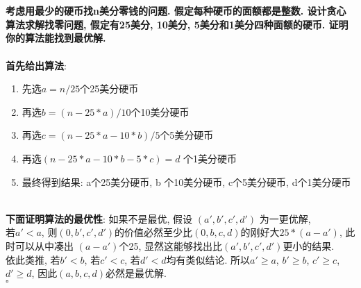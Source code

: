 \documentclass[UTF8]{article}
\newcommand{\jumpLine} {\hspace*{\fill} \\}
\begin{document}
\section{}
\textbf{考虑用最少的硬币找n美分零钱的问题. 假定每种硬币的面额都是整数. 设计贪心算法求解找零问题, 假定有25美分, 10美分, 5美分和1美分四种面额的硬币. 证明你的算法能找到最优解.}\\
\jumpLine
\textbf{首先给出算法}:
\begin{enumerate}[1. ]
	\item 先选$a=n/25$个25美分硬币
	\item 再选$b=(n-25*a)/10$个10美分硬币
	\item 再选$c=(n-25*a-10*b)/5$个5美分硬币
	\item 再选$(n-25*a-10*b-5*c)=d$ 个1美分硬币
	\item 最终得到结果: a个25美分硬币, b 个10美分硬币, c个5美分硬币, d个1美分硬币
\end{enumerate}
\jumpLine
\textbf{下面证明算法的最优性}:
如果不是最优, 假设 $(a',b',c',d')$ 为一更优解,\\
若$a'<a$, 则$(0,b',c',d')$的价值必然至少比$(0,b,c,d)$的刚好大$25*(a-a')$, 此时可以从中凑出 $(a-a')$个25, 显然这能够找出比$(a',b',c',d')$更小的结果.\\
依此类推, 若$b'<b$, 若$c'<c$, 若$d'<d$均有类似结论.
所以$a'\ge a$, $b'\ge b$, $c'\ge c$, $d'\ge d$, 因此$(a,b,c,d)$必然是最优解.\\
\hfill$\square$

%
\end{document}
